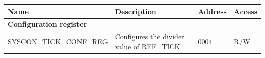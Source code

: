 \begin{longtable}{ | p{6cm} | p{7.2cm} | p{1.3cm} | p{1cm} | }
\hline\rowcolor{lightgray}
Name & Description &  Address & Access \\ \hline
\endhead
\multicolumn{4}{|l|}{\textbf{Configuration register}} \\ \hline
\hyperref[regdesc:SYSCONTICKCONFREG]{SYSCON\_TICK\_CONF\_REG} & Configures the divider value of REF\_TICK & \hexprefix{}0004 & R/W \\ \hline
\end{longtable}
